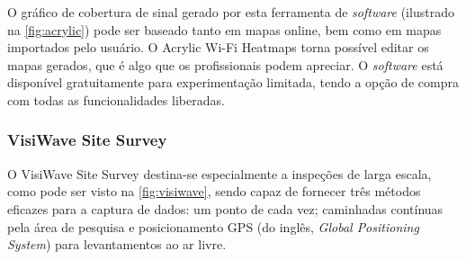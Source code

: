 O gráfico de cobertura  de sinal gerado por esta ferramenta de \textit{software} (ilustrado na \autoref{fig:acrylic}) pode ser baseado tanto em mapas online, bem como em mapas importados pelo usuário. O Acrylic Wi-Fi Heatmaps torna possível editar os mapas gerados, que é algo que os profissionais podem apreciar. O \textit{software} está disponível gratuitamente para experimentação limitada, tendo a opção de compra com todas as funcionalidades liberadas.

\begin{figure}[H]
	\centering
\end{figure}

\subsubsection{VisiWave Site Survey}
\label{subsubsec:visiwave}

O VisiWave Site Survey destina-se especialmente a inspeções de larga escala, como pode ser visto na \autoref{fig:visiwave}, sendo capaz de fornecer três métodos eficazes para a captura de dados: um ponto de cada vez; caminhadas contínuas pela área de pesquisa e posicionamento GPS (do inglês, \textit{Global Positioning System}) para levantamentos ao ar livre. 

